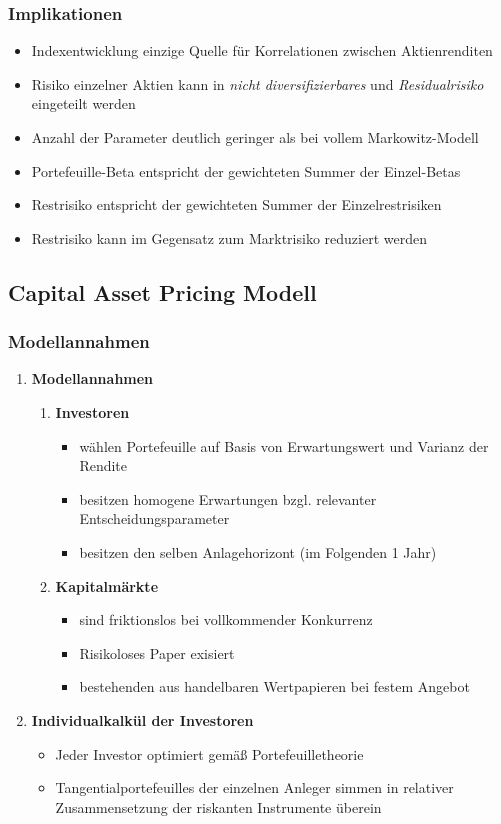 \subsubsection{Implikationen}
\begin{itemize}
	\item Indexentwicklung einzige Quelle für Korrelationen zwischen Aktienrenditen
	\item Risiko einzelner Aktien kann in \textit{nicht diversifizierbares} und \textit{Residualrisiko} eingeteilt werden
	\item Anzahl der Parameter deutlich geringer als bei vollem Markowitz-Modell
	\item Portefeuille-Beta entspricht der gewichteten Summer der Einzel-Betas
	\item Restrisiko entspricht der gewichteten Summer der Einzelrestrisiken
	\item Restrisiko kann im Gegensatz zum Marktrisiko reduziert werden
\end{itemize}


\subsection{Capital Asset Pricing Modell}

\subsubsection{Modellannahmen}
\begin{enumerate}
	\item \textbf{Modellannahmen}
	\begin{enumerate}
		\item \textbf{Investoren}
		\begin{itemize}
			\item wählen Portefeuille auf Basis von Erwartungswert und Varianz der Rendite
			\item besitzen homogene Erwartungen bzgl. relevanter Entscheidungsparameter
			\item besitzen den selben Anlagehorizont (im Folgenden 1 Jahr)
		\end{itemize}
		\item \textbf{Kapitalmärkte}
		\begin{itemize}
			\item sind friktionslos bei vollkommender Konkurrenz
			\item Risikoloses Paper exisiert
			\item bestehenden aus handelbaren Wertpapieren bei festem Angebot
		\end{itemize}
	\end{enumerate}
	\item \textbf{Individualkalkül der Investoren}
	\begin{itemize}
		\item Jeder Investor optimiert gemäß Portefeuilletheorie
		\item Tangentialportefeuilles der einzelnen Anleger simmen in relativer Zusammensetzung der riskanten Instrumente überein
	\end{itemize}
\end{enumerate}


